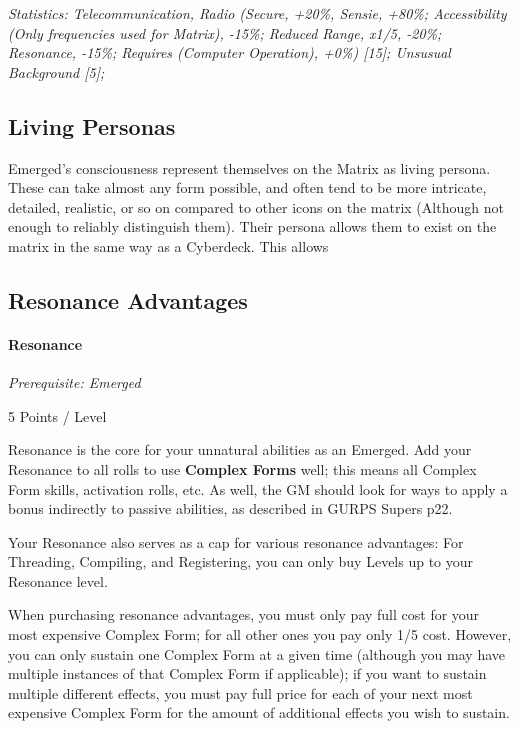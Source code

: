 \begin{multicols*}{3}
	\textit{\textcolor{OliveGreen}{Statistics: Telecommunication, Radio (Secure, +20\%, Sensie, +80\%; Accessibility (Only frequencies used for Matrix), -15\%; Reduced Range, x1/5, -20\%; Resonance, -15\%; Requires (Computer Operation), +0\%) [15]; Unsusual Background [5];}}
	
	\subsection{Living Personas}
	
	Emerged's consciousness represent themselves  on the Matrix as living persona. These can take almost any form possible, and often tend to be more intricate, detailed, realistic, or so on compared to other icons on the matrix (Although not enough to reliably distinguish them). Their persona allows them to exist on the matrix in the same way as a Cyberdeck. This allows 
	
	\subsection{Resonance Advantages}
	
	\paragraph{Resonance}
	\textit{Prerequisite: Emerged}
	\begin{flushright}
		5 Points / Level
	\end{flushright}
	
	Resonance is the core for your unnatural abilities as an Emerged. Add your Resonance to all rolls to use \textbf{Complex Forms} well; this means all Complex Form skills, activation rolls, etc. As well, the GM should look for ways to apply a bonus indirectly to passive abilities, as described in GURPS Supers p22.
	
	Your Resonance also serves as a cap for various resonance advantages: For Threading, Compiling, and Registering, you can only buy Levels up to your Resonance level.
	
	When purchasing resonance advantages, you must only pay full cost for your most expensive Complex Form; for all other ones you pay only 1/5 cost. However, you can only sustain one Complex Form at a given time (although you may have multiple instances of that Complex Form if applicable); if you want to sustain multiple different effects, you must pay full price for each of your next most expensive Complex Form for the amount of additional effects you wish to sustain.
	

\end{multicols*}
